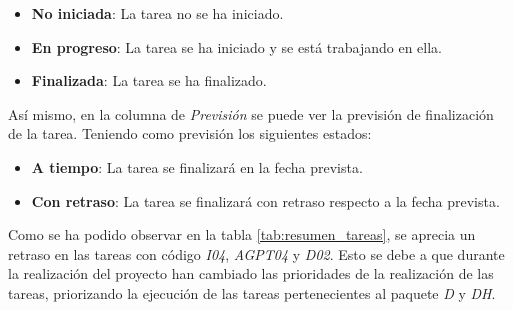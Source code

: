 \begin{itemize}
    \item \textbf{No iniciada}: La tarea no se ha iniciado.
    \item \textbf{En progreso}: La tarea se ha iniciado y se está trabajando en ella.
    \item \textbf{Finalizada}: La tarea se ha finalizado.
\end{itemize}

Así mismo, en la columna de \textit{Previsión} se puede ver la previsión de finalización de la tarea.
Teniendo como previsión los siguientes estados:

\begin{itemize}
    \item \textbf{A tiempo}: La tarea se finalizará en la fecha prevista.
    \item \textbf{Con retraso}: La tarea se finalizará con retraso respecto a la fecha prevista.
\end{itemize}

Como se ha podido observar en la tabla \ref{tab:resumen_tareas}, se aprecia un
retraso en las tareas con código \textit{I04}, \textit{AGPT04} y \textit{D02}.
Esto se debe a que durante la realización del proyecto han cambiado las prioridades
de la realización de las tareas, priorizando la ejecución de las tareas pertenecientes
al paquete \textit{D} y \textit{DH}.

